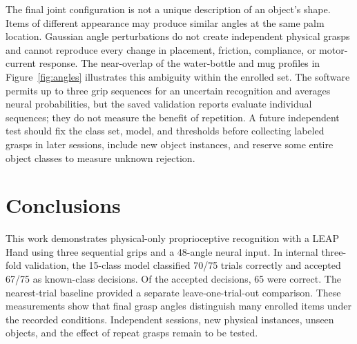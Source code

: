\documentclass[authoryear,12pt]{elsarticle}
\begin{document}
The final joint configuration is not a unique description
of an object's shape. Items of different appearance may
produce similar angles at the same palm location. Gaussian
angle perturbations do not create independent physical
grasps and cannot reproduce every change in placement,
friction, compliance, or motor-current response. The
near-overlap of the water-bottle and mug profiles in
Figure~\ref{fig:angles} illustrates this ambiguity within the
enrolled set. The
software permits up to three grip sequences for an
uncertain recognition and averages neural probabilities,
but the saved validation reports evaluate individual
sequences; they do not measure the benefit of repetition.
A future independent test should fix the class set,
model, and thresholds before collecting labeled grasps
in later sessions, include new object instances, and
reserve some entire object classes to measure unknown
rejection.

\section{Conclusions}
\label{sec:conclusions}

This work demonstrates physical-only proprioceptive
recognition with a LEAP Hand using three sequential
grips and a 48-angle neural input. In internal three-fold
validation, the 15-class model classified 70/75 trials
correctly and accepted 67/75 as known-class decisions.
Of the accepted decisions, 65 were correct.
The nearest-trial baseline provided a separate
leave-one-trial-out comparison. These measurements show
that final grasp angles distinguish many enrolled items
under the recorded conditions. Independent sessions,
new physical instances, unseen objects, and the effect
of repeat grasps remain to be tested.
\clearpage


\end{document}
